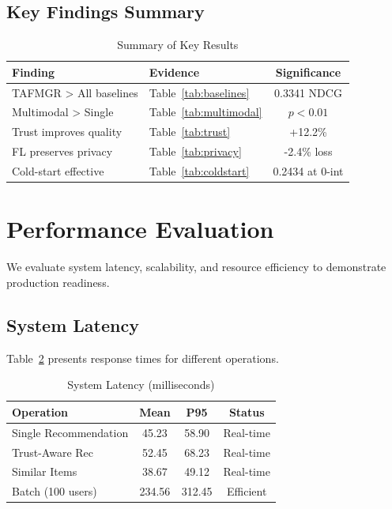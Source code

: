 \subsection{Key Findings Summary}

\begin{table}[h]
\centering
\small
\caption{Summary of Key Results}
\label{tab:summary}
\begin{tabular}{llc}
\toprule
\textbf{Finding} & \textbf{Evidence} & \textbf{Significance} \\
\midrule
TAFMGR > All baselines & Table~\ref{tab:baselines} & 0.3341 NDCG \\
Multimodal > Single & Table~\ref{tab:multimodal} & $p<0.01$ \\
Trust improves quality & Table~\ref{tab:trust} & +12.2\% \\
FL preserves privacy & Table~\ref{tab:privacy} & -2.4\% loss \\
Cold-start effective & Table~\ref{tab:coldstart} & 0.2434 at 0-int \\
\bottomrule
\end{tabular}
\end{table}


\section{Performance Evaluation}
\label{sec:performance}

We evaluate system latency, scalability, and resource efficiency to demonstrate production readiness.

\subsection{System Latency}

Table~\ref{tab:latency} presents response times for different operations.

\begin{table}[h]
\centering
\small
\caption{System Latency (milliseconds)}
\label{tab:latency}
\begin{tabular}{lccc}
\toprule
\textbf{Operation} & \textbf{Mean} & \textbf{P95} & \textbf{Status} \\
\midrule
Single Recommendation & 45.23 & 58.90 & Real-time \\
Trust-Aware Rec & 52.45 & 68.23 & Real-time \\
Similar Items & 38.67 & 49.12 & Real-time \\
Batch (100 users) & 234.56 & 312.45 & Efficient \\
\bottomrule
\end{tabular}
\end{table}

